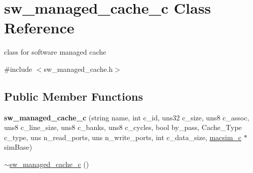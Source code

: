 \hypertarget{classsw__managed__cache__c}{
\section{sw\_\-managed\_\-cache\_\-c Class Reference}
\label{classsw__managed__cache__c}
}


class for software managed cache  




{\ttfamily \#include $<$sw\_\-managed\_\-cache.h$>$}

\subsection*{Public Member Functions}
\begin{DoxyCompactItemize}
\item 
\hypertarget{classsw__managed__cache__c_a660f86cbb0eb151ee31a6bbbc24cf45c}{
{\bfseries sw\_\-managed\_\-cache\_\-c} (string name, int c\_\-id, uns32 c\_\-size, uns8 c\_\-assoc, uns8 c\_\-line\_\-size, uns8 c\_\-banks, uns8 c\_\-cycles, bool by\_\-pass, Cache\_\-Type c\_\-type, uns n\_\-read\_\-ports, uns n\_\-write\_\-ports, int c\_\-data\_\-size, \hyperlink{classmacsim__c}{macsim\_\-c} $\ast$simBase)}
\label{classsw__managed__cache__c_a660f86cbb0eb151ee31a6bbbc24cf45c}

\item 
\hypertarget{classsw__managed__cache__c_a72f3ee4c054befacd2739339a5a7e8cc}{
\hyperlink{classsw__managed__cache__c_a72f3ee4c054befacd2739339a5a7e8cc}{$\sim$sw\_\-managed\_\-cache\_\-c} ()}
\label{classsw__managed__cache__c_a72f3ee4c054befacd2739339a5a7e8cc}


\end{DoxyCompactItemize}

